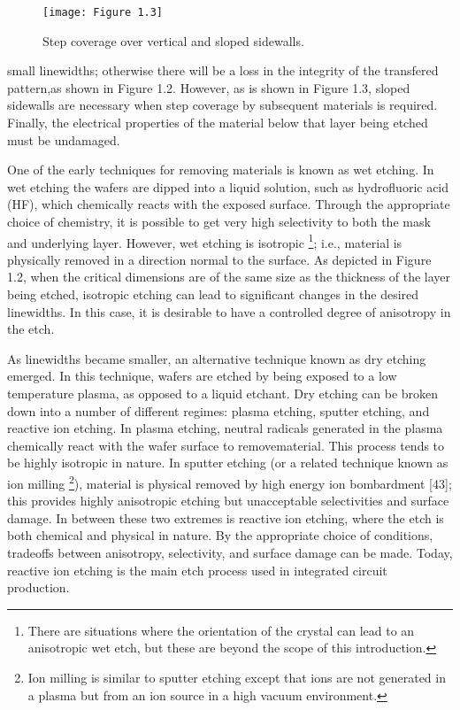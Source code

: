 \begin{figure}[H]
	\centering
	\texttt{[image: Figure 1.3]}
	\bf\caption{Step coverage over vertical and sloped sidewalls.}
	\label{fig:1.3}
\end{figure}

\noindent small linewidths; otherwise there will be a loss in the integrity of the transfered pattern,as shown in Figure 1.2. However, as is shown in Figure 1.3, sloped sidewalls are necessary when step coverage by subsequent materials is required. Finally, the electrical properties of the material below that layer being etched must be undamaged.

One of the early techniques for removing materials is known as wet etching. In wet etching the wafers are dipped into a liquid solution, such as hydrofluoric acid (HF), which chemically reacts with the exposed surface. Through the appropriate choice of chemistry, it is possible to get very high selectivity to both the mask and underlying layer. However, wet etching is isotropic \footnote{There are situations where the orientation of the crystal can lead to an anisotropic wet etch, but these are beyond the scope of this introduction.}; i.e., material is physically removed in a direction normal to the surface. As depicted in Figure 1.2, when the critical dimensions are of the same size as the thickness of the layer being etched, isotropic etching can lead to significant changes in the desired linewidths. In this case, it is desirable to have a controlled degree of anisotropy in the etch.

As linewidths became smaller, an alternative technique known as dry etching emerged. In this technique, wafers are etched by being exposed to a low temperature plasma, as opposed to a liquid etchant. Dry etching can be broken down into a number of different regimes: plasma etching, sputter etching, and reactive ion etching. In plasma etching, neutral radicals generated in the plasma chemically react with the wafer surface to removematerial. This process tends to be highly isotropic in nature. In sputter etching (or a related technique known as ion milling \footnote{Ion milling is similar to sputter etching except that ions are not generated in a plasma but from an ion
	source in a high vacuum environment.}), material is physical removed by high energy ion bombardment [43]; this provides highly anisotropic etching but unacceptable selectivities and surface damage. In between these two extremes is reactive ion etching, where the etch is both chemical and physical in nature. By the appropriate choice of conditions, tradeoffs between anisotropy, selectivity, and surface damage can be made. Today, reactive ion etching is the main etch process used in integrated circuit production.


